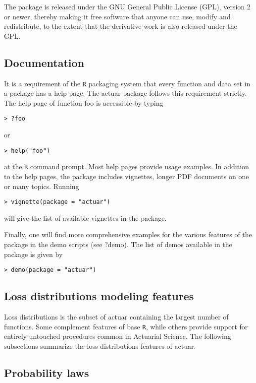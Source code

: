 \documentclass[12pt]{article}
\begin{document}
The package is released under the GNU General Public License (GPL), version 2 or newer, thereby making it free software that anyone can use, modify and redistribute, to the extent that the derivative work is also released under the GPL.

\subsection{Documentation}

It is a requirement of the \texttt{R} packaging system that every function and data set in a package has a help page. The actuar package follows this requirement strictly. The help page of function foo is accessible by typing


\begin{verbatim}
> ?foo
\end{verbatim}
or
\begin{verbatim}
> help("foo")
\end{verbatim}


at the \texttt{R} command prompt. Most help pages provide usage examples. In addition to the help pages, the package includes vignettes, longer PDF documents on one or many topics. Running 
\begin{verbatim}
> vignette(package = "actuar")
\end{verbatim}
will give the list of available vignettes in the package.

Finally, one will find more comprehensive examples for the various features of the package in the demo scripts (see ?demo). The list of demos available in the package is given by

\begin{verbatim}
> demo(package = "actuar")
\end{verbatim}


\subsection{Loss distributions modeling features}

Loss distributions is the subset of actuar containing the largest number of functions. Some complement features of base \texttt{R}, while others provide support for entirely untouched procedures common in Actuarial Science. The following subsections summarize the loss distributions features of actuar. 

\subsection{Probability laws}
\end{document}
